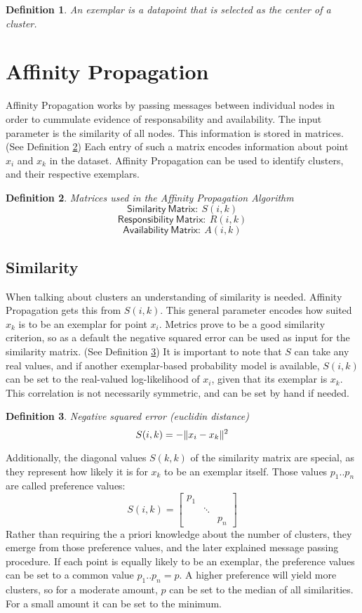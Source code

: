 \documentclass[11pt,a4paper]{article}
\newtheorem{definition}{Definition}
\DeclarePairedDelimiter\norm{\lVert}{\rVert}
\begin{document}
\begin{definition}\label{def:exemplar}
	An exemplar is a datapoint that is selected as the center of a cluster.
\end{definition}

\pagebreak
\section{Affinity Propagation}

Affinity Propagation works by passing messages between individual nodes in order to cummulate evidence of responsability and availability. The input parameter is the similarity of all nodes. This information is stored in matrices. (See Definition \ref{def:matrices}) Each entry of such a matrix encodes information about point $x_i$ and $x_k$ in the dataset. Affinity Propagation can be used to identify clusters, and their respective exemplars.
\begin{definition}\label{def:matrices}
	Matrices used in the Affinity Propagation Algorithm
	\[
		\mathsf{Similarity\ Matrix:}\  S(i,k) 
	\]
	\[
		\mathsf{Responsibility\ Matrix:}\  R(i,k) 
	\]
	\[
		\mathsf{Availability\ Matrix:}\  A(i,k) 
	\]
\end{definition}
\subsection{Similarity}
When talking about clusters an understanding of similarity is needed. Affinity Propagation gets this from $S(i,k)$. This general parameter encodes how suited $x_k$ is to be an exemplar for point $x_i$. Metrics prove to be a good similarity criterion, so as a default the negative squared error can be used as input for the similarity matrix. \cite{frey2007clustering} (See Definition \ref{def:negsquared}) It is important to note that $S$ can take any real values, and if another exemplar-based probability model is available, $S(i,k)$ can be set to the real-valued log-likelihood of $x_i$, given that its exemplar is $x_k$. This correlation is not necessarily symmetric, and can be set by hand if needed. \cite{frey2007clustering}
\begin{definition}\label{def:negsquared}
	Negative squared error (euclidin distance)
	\[
		S(i,k) = - \norm{x_i - x_k}^2
	\]
\end{definition}
Additionally, the diagonal values $S(k,k)$ of the similarity matrix are special, as they represent how likely it is for $x_k$ to be an exemplar itself. Those values $p_1 .. p_n$ are called preference values:
\[
	S(i,k) = \begin{bmatrix}p_{1} & & \\ & \ddots & \\ & & p_{n}\end{bmatrix}
\]
Rather than requiring the a priori knowledge about the number of clusters, they emerge from those preference values, and the later explained message passing procedure. If each point is equally likely to be an exemplar, the preference values can be set to a common value $p_1..p_n = p$. A higher preference will yield more clusters, so for a moderate amount, $p$ can be set to the median of all similarities. For a small amount it can be set to the minimum.\cite{frey2007clustering}
\end{document}
